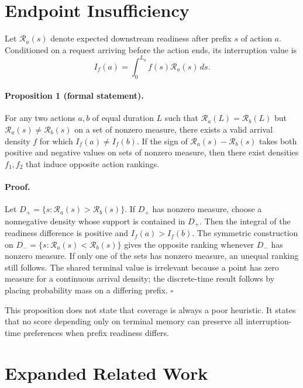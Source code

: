 \section{Endpoint Insufficiency}
\label{app:proof}

Let $\mathcal{R}_a(s)$ denote expected downstream readiness after prefix $s$ of action $a$.
Conditioned on a request arriving before the action ends, its interruption value is
\begin{equation}
I_f(a)=\int_0^{L_a} f(s)\mathcal{R}_a(s)\,ds.
\end{equation}

\paragraph{Proposition 1 (formal statement).}
For any two actions $a,b$ of equal duration $L$ such that
$\mathcal{R}_a(L)=\mathcal{R}_b(L)$ but
$\mathcal{R}_a(s)\neq\mathcal{R}_b(s)$ on a set of nonzero measure,
there exists a valid arrival density $f$ for which $I_f(a)\neq I_f(b)$.
If the sign of $\mathcal{R}_a(s)-\mathcal{R}_b(s)$ takes both positive and negative values on sets of nonzero measure, then there exist densities $f_1,f_2$ that induce opposite action rankings.

\paragraph{Proof.}
Let $D_+=\{s:\mathcal{R}_a(s)>\mathcal{R}_b(s)\}$.
If $D_+$ has nonzero measure, choose a nonnegative density whose support is contained in $D_+$.
Then the integral of the readiness difference is positive and $I_f(a)>I_f(b)$.
The symmetric construction on
$D_-=\{s:\mathcal{R}_a(s)<\mathcal{R}_b(s)\}$
gives the opposite ranking whenever $D_-$ has nonzero measure.
If only one of the sets has nonzero measure, an unequal ranking still follows.
The shared terminal value is irrelevant because a point has zero measure for a continuous arrival density; the discrete-time result follows by placing probability mass on a differing prefix.
\hfill$\square$

This proposition does not state that coverage is always a poor heuristic.
It states that no score depending only on terminal memory can preserve all interruption-time preferences when prefix readiness differs.

\section{Expanded Related Work}
\label{app:related}

